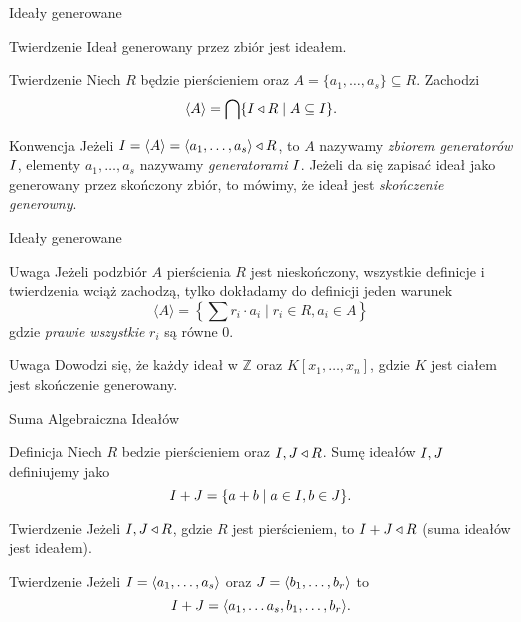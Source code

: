 \documentclass{beamer}
\newcommand{\II}{\mathnormal{I}}
\newcommand{\JJ}{\mathnormal{J}}
\begin{document}
\begin{frame}{Ideały generowane}
    \begin{block}{Twierdzenie}
        Ideał generowany przez zbiór jest ideałem.
    \end{block}
    \begin{block}{Twierdzenie}
        Niech $R$ będzie pierścieniem oraz $A = \{a_1, \ldots , a_s\} \subseteq R$.
        Zachodzi
        $$\langle A \rangle = \bigcap\{\II \triangleleft R \mid A \subseteq \II \}.$$
    \end{block}    
    \pause 
    \begin{alertblock}{Konwencja}
        Jeżeli $\II = \langle A \rangle = \langle a_1 , \ldots , a_s \rangle  \triangleleft R$, to $A$ nazywamy \textit{zbiorem generatorów} $\II$, elementy $a_1, \ldots , a_s$ nazywamy \textit{generatorami} $\II$. Jeżeli da się zapisać ideał jako generowany przez skończony zbiór, to mówimy, że ideał jest \textit{skończenie generowny}.
    \end{alertblock}
\end{frame}

\begin{frame}{Ideały generowane}
    \begin{alertblock}{Uwaga}
        Jeżeli podzbiór $A$ pierścienia $R$ jest nieskończony, wszystkie definicje i twierdzenia wciąż zachodzą, tylko dokładamy do definicji jeden warunek
        $$ \langle A \rangle = \left\{ \sum r_i \cdot a_i \mid r_i \in R, a_i \in A \right\}$$ gdzie \textit{prawie wszystkie} $r_i$ są równe 0.    
    \end{alertblock}
    \pause 
    \begin{alertblock}{Uwaga}
        Dowodzi się, że każdy ideał w $\mathbb{Z}$ oraz $K[x_1, \ldots , x_n]$, gdzie $K$ jest ciałem jest skończenie generowany.
    \end{alertblock}
\end{frame}

\begin{frame}{Suma Algebraiczna Ideałów}
    \begin{block}{Definicja}
        Niech $R$ bedzie pierścieniem oraz $\II, \JJ \triangleleft R$. \alert{Sumę ideałów $\II, \JJ$} definiujemy jako
        $$\II + \JJ = \{ a+b \mid a \in \II, b \in \JJ\}.$$
    \end{block}
    \pause 
    \begin{block}{Twierdzenie}
        Jeżeli $\II , \JJ \triangleleft R$, gdzie $R$ jest pierścieniem, to $\II + \JJ \triangleleft R$ (suma ideałów jest ideałem). 
    \end{block}
    \pause
    \begin{block}{Twierdzenie}
        Jeżeli $\II = \langle a_1, \ldots, a_s \rangle$ oraz $\JJ = \langle b_1, \ldots, b_r \rangle$ to 
        $$ \II + \JJ = \langle a_1, \ldots a_s, b_1, \ldots, b_r \rangle.$$
    \end{block}
\end{frame}
\end{document}
